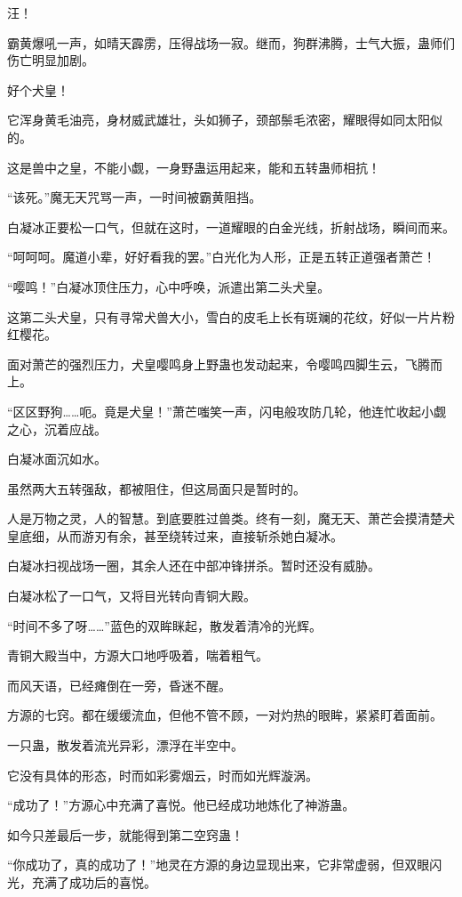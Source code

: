\begin{this_body}
汪！

霸黄爆吼一声，如晴天霹雳，压得战场一寂。继而，狗群沸腾，士气大振，蛊师们伤亡明显加剧。

好个犬皇！

它浑身黄毛油亮，身材威武雄壮，头如狮子，颈部鬃毛浓密，耀眼得如同太阳似的。

这是兽中之皇，不能小觑，一身野蛊运用起来，能和五转蛊师相抗！

“该死。”魔无天咒骂一声，一时间被霸黄阻挡。

白凝冰正要松一口气，但就在这时，一道耀眼的白金光线，折射战场，瞬间而来。

“呵呵呵。魔道小辈，好好看我的罢。”白光化为人形，正是五转正道强者萧芒！

“嘤鸣！”白凝冰顶住压力，心中呼唤，派遣出第二头犬皇。

这第二头犬皇，只有寻常犬兽大小，雪白的皮毛上长有斑斓的花纹，好似一片片粉红樱花。

面对萧芒的强烈压力，犬皇嘤鸣身上野蛊也发动起来，令嘤鸣四脚生云，飞腾而上。

“区区野狗……呃。竟是犬皇！”萧芒嗤笑一声，闪电般攻防几轮，他连忙收起小觑之心，沉着应战。

白凝冰面沉如水。

虽然两大五转强敌，都被阻住，但这局面只是暂时的。

人是万物之灵，人的智慧。到底要胜过兽类。终有一刻，魔无天、萧芒会摸清楚犬皇底细，从而游刃有余，甚至绕转过来，直接斩杀她白凝冰。

白凝冰扫视战场一圈，其余人还在中部冲锋拼杀。暂时还没有威胁。

白凝冰松了一口气，又将目光转向青铜大殿。

“时间不多了呀……”蓝色的双眸眯起，散发着清冷的光辉。

青铜大殿当中，方源大口地呼吸着，喘着粗气。

而风天语，已经瘫倒在一旁，昏迷不醒。

方源的七窍。都在缓缓流血，但他不管不顾，一对灼热的眼眸，紧紧盯着面前。

一只蛊，散发着流光异彩，漂浮在半空中。

它没有具体的形态，时而如彩雾烟云，时而如光辉漩涡。

“成功了！”方源心中充满了喜悦。他已经成功地炼化了神游蛊。

如今只差最后一步，就能得到第二空窍蛊！

“你成功了，真的成功了！”地灵在方源的身边显现出来，它非常虚弱，但双眼闪光，充满了成功后的喜悦。


\end{this_body}
